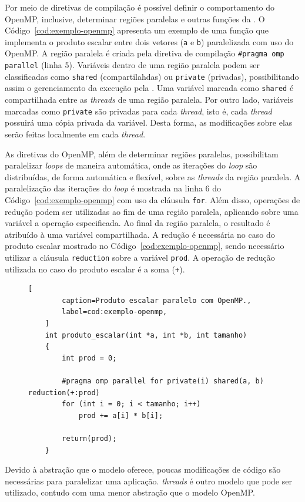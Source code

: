 Por meio de diretivas de compilação é possível definir o comportamento do
OpenMP, inclusive, determinar regiões paralelas e outras funções da \api.
O Código~\ref{cod:exemplo-openmp} apresenta um exemplo de uma função
que implementa o produto escalar entre dois vetores (\texttt{a} e \texttt{b}) paralelizada
com uso do OpenMP. A região paralela é criada pela diretiva de compilação
\texttt{\#pragma omp parallel} (linha 5). Variáveis dentro de uma região paralela
podem ser classificadas como \texttt{shared} (compartilahdas) ou \texttt{private} (privadas),
possibilitando assim o gerenciamento da execução pela \api. Uma variável marcada como \texttt{shared}
é compartilhada entre as \textit{threads} de uma região paralela. Por outro lado, variáveis marcadas
como \texttt{private} são privadas para cada \textit{thread}, isto é, cada \textit{thread} possuirá uma
cópia privada da variável. Desta forma, as modificações sobre elas serão feitas localmente em cada
\textit{thread}.

As diretivas do OpenMP, além de determinar regiões paralelas, possibilitam
paralelizar \textit{loops} de maneira automática, onde as iterações
do \textit{loop} são distribuídas, de forma automática e flexível, sobre as
\textit{threads} da região paralela. A paralelização das iterações do \textit{loop} é mostrada na linha 6 do
Código~\ref{cod:exemplo-openmp} com uso da cláusula \texttt{for}. Além disso, operações de redução podem ser
utilizadas ao fim de uma região paralela, aplicando sobre uma variável a
operação especificada. Ao final da região paralela, o resultado é atribuído à uma variável compartilhada. A redução
é necessária no caso do produto escalar mostrado no Código~\ref{cod:exemplo-openmp}, sendo necessário
utilizar a cláusula \texttt{reduction} sobre a variável \texttt{prod}. A operação de redução utilizada no caso do produto
escalar é a soma (\texttt{+}).

\begin{figure}[t]
	\begin{lstlisting}[
		caption=Produto escalar paralelo com OpenMP.,
		label=cod:exemplo-openmp,
	]
	int produto_escalar(int *a, int *b, int tamanho)
	{
		int prod = 0;

		#pragma omp parallel for private(i) shared(a, b) reduction(+:prod)
		for (int i = 0; i < tamanho; i++)
			prod += a[i] * b[i];

		return(prod);
	}
	\end{lstlisting}
\end{figure}

Devido à abstração que o modelo oferece, poucas modificações de código são
necessárias para paralelizar uma aplicação. \posix \textit{threads} é outro
modelo que pode ser utilizado, contudo com uma menor abstração que o modelo
OpenMP.

